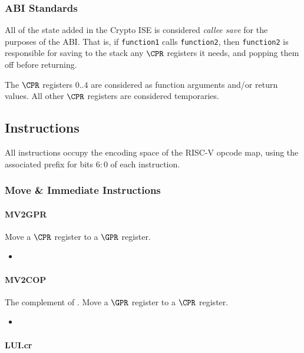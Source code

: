 \subsubsection{ABI Standards}

All of the state added in the Crypto ISE is considered {\em callee save}
for the purposes of the ABI. That is, if {\tt function1} calls 
{\tt function2}, then {\tt function2} is responsible for saving to the
stack any $\CPR$ registers it needs, and popping them off before returning.

The $\CPR$ registers $0..4$ are considered as function arguments
and/or return values. 
All other $\CPR$ registers are considered temporaries.

\subsection{Instructions}

All instructions occupy the \encspace encoding space of the RISC-V opcode
map, using the associated \encopcode prefix for bits $6:0$ of each 
instruction.

\subsubsection{Move \& Immediate Instructions}
\paragraph{MV2GPR}

Move a $\CPR$ register to a $\GPR$ register.

\begin{itemize}
\item {}
\end{itemize}


\paragraph{MV2COP}

The complement of .
Move a $\GPR$ register to a $\CPR$ register.

\begin{itemize}
\item {}
\end{itemize}

\paragraph{LUI.cr}


